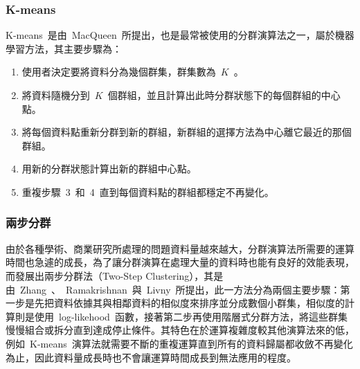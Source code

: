 \subsubsection{K-means}

K-means~是由~MacQueen\cite{macqueen67}~所提出，也是最常被使用的分群演算法之一，屬於機器學習方法，其主要步驟為：

\begin{enumerate}
\item 使用者決定要將資料分為幾個群集，群集數為~$K$~。
\item 將資料隨機分到~$K$~個群組，並且計算出此時分群狀態下的每個群組的中心點。
\item 將每個資料點重新分群到新的群組，新群組的選擇方法為中心離它最近的那個群組。
\item 用新的分群狀態計算出新的群組中心點。
\item 重複步驟~3~和~4~直到每個資料點的群組都穩定不再變化。
\end{enumerate}




\subsubsection{兩步分群}

由於各種學術、商業研究所處理的問題資料量越來越大，分群演算法所需要的運算時間也急遽的成長，為了讓分群演算在處理大量的資料時也能有良好的效能表現，而發展出兩步分群法（Two-Step Clustering），其是由~Zhang~、~Ramakrishnan~與~Livny\cite{zhang1996birch}~所提出，此一方法分為兩個主要步驟：第一步是先把資料依據其與相鄰資料的相似度來排序並分成數個小群集，相似度的計算則是使用~log-likehood~函數，接著第二步再使用階層式分群方法，將這些群集慢慢組合或拆分直到達成停止條件。其特色在於運算複雜度較其他演算法來的低，例如~K-means~演算法就需要不斷的重複運算直到所有的資料歸屬都收斂不再變化為止，因此資料量成長時也不會讓運算時間成長到無法應用的程度。


